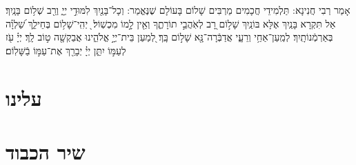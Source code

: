 \documentclass[twoside, openany, parskip=half, 11pt]{book}
\begin{document}
\vspace{-.3\baselineskip}
 אָמַר רְבִי חֲנִינָא: תַּלְמִידֵי חֲכָמִים מַרְבִּים שָׁלוֹם בָּעוֹלָם שֶׁנֶּאֱמַר: וְכָל־בָּנַ֖יִךְ לִמּוּדֵ֣י יְיָ֑ וְרַ֖ב שְׁל֥וֹם בָּנָֽיִךְ׃ אַל תִּקְרָא בָּנַֽיִךְ אֶלָּא בּוֹנַֽיִךְ שָׁל֣וֹם רָ֭ב לְאֹֽהֲבֵ֣י תוֹרָתֶ֑ךָ וְאֵ֖ין לָ֣מוֹ מִכְשֽׁוֹל׃   ֖ יְהִֽי־שָׁל֥וֹם בְּחֵילֵ֑ךְ שַׁ֝לְוָ֗ה בְּאַרְמְֿנוֹתָֽיִךְ׃ לְמַֽעַן־אַחַ֥י וְרֵעָ֑י אֲדַבְּֿרָה־נָּ֖א שָׁל֣וֹם בָּֽךְ׃ לְ֭מַעַן בֵּית־יְיָ֣ אֱלֹהֵ֑ינוּ אֲבַקְשָׁ֖ה ט֣וֹב לָֽךְ׃ יְיָ֗ עֹ֖ז לְעַמּ֣וֹ יִתֵּ֑ן יְיָ֓ יְבָרֵ֖ךְ אֶת־עַמּ֣וֹ בַֿשָּׁלֽוֹם׃
 
\mournerskaddish

\section*{ עלינו } 

\aleinu



\clearpage

\vspace{-1\baselineskip}
\section*{ שיר הכבוד }
\label{shir_shel_shabbos}
\end{document}

